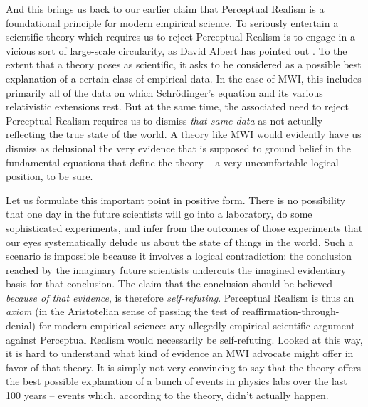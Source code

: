 \documentclass[12pt]{article}
\begin{document}
And this brings us back to our earlier claim that Perceptual Realism
is a foundational principle for modern empirical science.  To
seriously entertain a scientific theory which requires us to reject
Perceptual Realism is to engage in a vicious sort of large-scale 
circularity, as David Albert has pointed out \cite{albert2}.  
To the extent that a
theory poses as scientific, it asks to be considered as a possible
best explanation of a certain class of empirical data.  In the case
of MWI, this includes primarily all of the data on which
Schr\"odinger's equation and its various relativistic extensions  
rest.  But at the same time, the associated need to reject
Perceptual Realism requires us to dismiss \emph{that same data} 
as not actually reflecting the true state of the world.  A theory like
MWI would evidently have us dismiss as delusional the very evidence
that is supposed to ground belief in the fundamental equations that
define the theory -- a very uncomfortable logical position, to be sure.  

Let us formulate this important point in positive form.  There is no 
possibility that one day in the future scientists will go into a 
laboratory, do some sophisticated experiments, and infer from the 
outcomes of those experiments that our eyes systematically delude us
about the state of things in the world.  Such a scenario is impossible
because it involves a logical contradiction:  the conclusion reached
by the imaginary future scientists undercuts the imagined
evidentiary basis for that conclusion.  The claim that the
conclusion should be believed \emph{because of that evidence}, is
therefore \emph{self-refuting}.  
Perceptual Realism is thus an \emph{axiom} (in the Aristotelian sense
of passing the test of reaffirmation-through-denial) for modern 
empirical science:  any allegedly empirical-scientific argument
against Perceptual Realism would necessarily
be self-refuting.  Looked at this
way, it is hard to understand what kind of evidence an MWI advocate might 
offer in favor of that theory.  It is simply not very convincing to 
say that the theory offers the best possible explanation  of a bunch
of events in physics labs over the last 100 years -- events which,
according to the theory, didn't actually happen.
\end{document}
